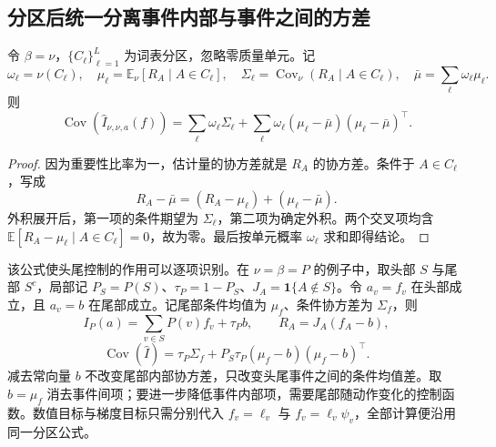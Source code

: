 \documentclass[lang=cn,scheme=chinese,openany]{../book/elegantbook}
\newcommand{\E}{\mathbb E}
\begin{document}
\subsection{分区后统一分离事件内部与事件之间的方差}

\begin{theorem}
\label{est:thm:kl-master-partition}
令 $\beta=\nu$，$\{C_\ell\}_{\ell=1}^L$ 为词表分区，忽略零质量单元。记
\begin{equation*}
 \omega_\ell=\nu(C_\ell),\quad
 \mu_\ell=\E_\nu[R_A\mid A\in C_\ell],\quad
 \Sigma_\ell=\operatorname{Cov}_\nu(R_A\mid A\in C_\ell),\quad
 \bar\mu=\sum_\ell\omega_\ell\mu_\ell.
\end{equation*}
则
\begin{equation}
 \operatorname{Cov}(\widehat I_{\nu,\nu,a}(f))
 =\sum_\ell\omega_\ell\Sigma_\ell
  +\sum_\ell\omega_\ell(\mu_\ell-\bar\mu)(\mu_\ell-\bar\mu)^\top.
 \label{est:eq:kl-master-partition}
\end{equation}
\end{theorem}

\begin{proof}
因为重要性比率为一，估计量的协方差就是 $R_A$ 的协方差。条件于 $A\in C_\ell$，写成
\begin{equation*}
 R_A-\bar\mu=(R_A-\mu_\ell)+(\mu_\ell-\bar\mu).
\end{equation*}
外积展开后，第一项的条件期望为 $\Sigma_\ell$，第二项为确定外积。两个交叉项均含 $\E[R_A-\mu_\ell\mid A\in C_\ell]=0$，故为零。最后按单元概率 $\omega_\ell$ 求和即得结论。
\end{proof}

该公式使头尾控制的作用可以逐项识别。在 $\nu=\beta=P$ 的例子中，取头部 $S$ 与尾部 $S^c$，局部记 $P_S=P(S)$、$\tau_P=1-P_S$、$J_A=\mathbf1\{A\notin S\}$。令 $a_v=f_v$ 在头部成立，且 $a_v=b$ 在尾部成立。记尾部条件均值为 $\mu_f$、条件协方差为 $\Sigma_f$，则
\begin{equation*}
 I_P(a)=\sum_{v\in S}P(v)f_v+\tau_Pb,\qquad
 R_A=J_A(f_A-b),
\end{equation*}
\begin{equation}
 \operatorname{Cov}(\widehat I)
 =\tau_P\Sigma_f+P_S\tau_P(\mu_f-b)(\mu_f-b)^\top.
 \label{est:eq:kl-master-head-tail}
\end{equation}
减去常向量 $b$ 不改变尾部内部协方差，只改变头尾事件之间的条件均值差。取 $b=\mu_f$ 消去事件间项；要进一步降低事件内部项，需要尾部随动作变化的控制函数。数值目标与梯度目标只需分别代入 $f_v=\ell_v$ 与 $f_v=\ell_v\psi_v$，全部计算便沿用同一分区公式。
\end{document}
